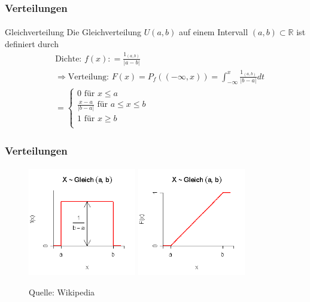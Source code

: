 \documentclass{beamer}
\begin{document}
\begin{frame}
    \frametitle{Verteilungen}
\framesubtitle{}

\begin{block}{Gleichverteilung}
Die Gleichverteilung $U{(a,b)}$ auf einem Intervall $(a,b) \subset \mathbb{R}$ ist definiert durch
\begin{align*}
& \text{Dichte: } f (x) : = \frac{1_{(a,b)}}{|a-b| } \\
& \Rightarrow \text{Verteilung: } F (x) =  P_f( (-\infty, x))  =  \int_{-\infty}^{x} \frac{1_{(a,b)}}{|b-a|} dt\\\
& = \begin {cases} 0 \text{ für } x \leq a \\   \frac{x-a}{|b-a|} \text{ für } a \leq x \leq b \\ 1 \text{ für }  x \geq b \\  \end{cases}
\end{align*}
\end{block}

 \end{frame}

\begin{frame}
    \frametitle{Verteilungen}
\framesubtitle{}

\begin{figure}[htp]
      \centering
    \includegraphics[width=0.42\textwidth]{img/gleichverteilung1}
    \includegraphics[width=0.42\textwidth]{img/gleichverteilung2}
      \caption{Quelle: Wikipedia}
\end{figure}
 \end{frame}
\end{document}
